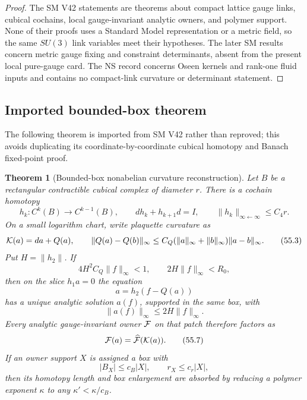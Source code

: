 \documentclass[11pt,oneside]{book}
\newtheorem{theorem}{Theorem}[chapter]
\theoremstyle{definition}
\theoremstyle{remark}
\begin{document}
\begin{proof}
The SM V42 statements are theorems about compact lattice gauge
links, cubical cochains, local gauge-invariant analytic owners, and
polymer support.  None of their proofs uses a Standard Model
representation or a metric field, so the same \(SU(3)\) link
variables meet their hypotheses.  The later SM results concern
metric gauge fixing and constraint determinants, absent from the
present local pure-gauge card.  The NS record concerns Oseen
kernels and rank-one fluid inputs and contains no compact-link
curvature or determinant statement.
\end{proof}

\subsection{Imported bounded-box theorem}

The following theorem is imported from SM V42 rather than
reproved; this avoids duplicating its coordinate-by-coordinate
cubical homotopy and Banach fixed-point proof.

\begin{theorem}[Bounded-box nonabelian curvature reconstruction]
\label{thm:e8v55-imported-curvature}
Let \(B\) be a rectangular contractible cubical complex of diameter
\(r\).  There is a cochain homotopy
\[
 h_k:C^k(B)\longrightarrow C^{k-1}(B),\qquad
 dh_k+h_{k+1}d=I,\qquad
 \|h_k\|_{\infty\leftarrow\infty}\le C_4r.                   \tag{55.2}
\]
On a small logarithm chart, write plaquette curvature as
\[
 {\cal K}(a)=da+Q(a),\qquad
 \|Q(a)-Q(b)\|_\infty
 \le C_Q(\|a\|_\infty+\|b\|_\infty)\|a-b\|_\infty.            \tag{55.3}
\]
Put \(H=\|h_2\|\).  If
\[
 4H^2C_Q\|f\|_\infty<1,\qquad
 2H\|f\|_\infty<R_0,                                         \tag{55.4}
\]
then on the slice \(h_1a=0\) the equation
\[
 a=h_2(f-Q(a))                                               \tag{55.5}
\]
has a unique analytic solution \(a(f)\), supported in the same
box, with
\[
 \|a(f)\|_\infty\le2H\|f\|_\infty.                           \tag{55.6}
\]
Every analytic gauge-invariant owner \({\cal F}\) on that patch
therefore factors as
\[
 {\cal F}(a)=\widehat{\cal F}({\cal K}(a)).                   \tag{55.7}
\]
If an owner support \(X\) is assigned a box with
\[
 |B_X|\le c_B|X|,\qquad r_X\le c_r|X|,                       \tag{55.8}
\]
then its homotopy length and box enlargement are absorbed by
reducing a polymer exponent \(\kappa\) to any
\(\kappa'<\kappa/c_B\).
\end{theorem}
\end{document}
